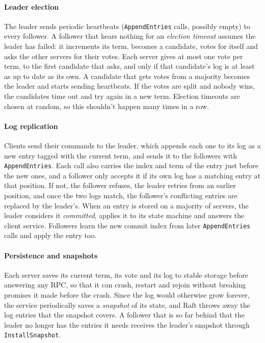 \documentclass[conference]{IEEEtran}
\begin{document}
\paragraph{Leader election} The leader sends periodic heartbeats (\texttt{AppendEntries} calls, possibly empty) to every follower. A follower that hears nothing for an \emph{election timeout} assumes the leader has failed: it increments its term, becomes a candidate, votes for itself and asks the other servers for their votes. Each server gives at most one vote per term, to the first candidate that asks, and only if that candidate's log is at least as up to date as its own. A candidate that gets votes from a majority becomes the leader and starts sending heartbeats. If the votes are split and nobody wins, the candidates time out and try again in a new term. Election timeouts are chosen at random, so this shouldn't happen many times in a row.

\paragraph{Log replication} Clients send their commands to the leader, which appends each one to its log as a new entry tagged with the current term, and sends it to the followers with \texttt{AppendEntries}. Each call also carries the index and term of the entry just before the new ones, and a follower only accepts it if its own log has a matching entry at that position. If not, the follower refuses, the leader retries from an earlier position, and once the two logs match, the follower's conflicting entries are replaced by the leader's. When an entry is stored on a majority of servers, the leader considers it \emph{committed}, applies it to its state machine and answers the client service. Followers learn the new commit index from later \texttt{AppendEntries} calls and apply the entry too.

\paragraph{Persistence and snapshots} Each server saves its current term, its vote and its log to stable storage before answering any RPC, so that it can crash, restart and rejoin without breaking promises it made before the crash. Since the log would otherwise grow forever, the service periodically saves a \emph{snapshot} of its state, and Raft throws away the log entries that the snapshot covers. A follower that is so far behind that the leader no longer has the entries it needs receives the leader's snapshot through \texttt{InstallSnapshot}.
\end{document}
